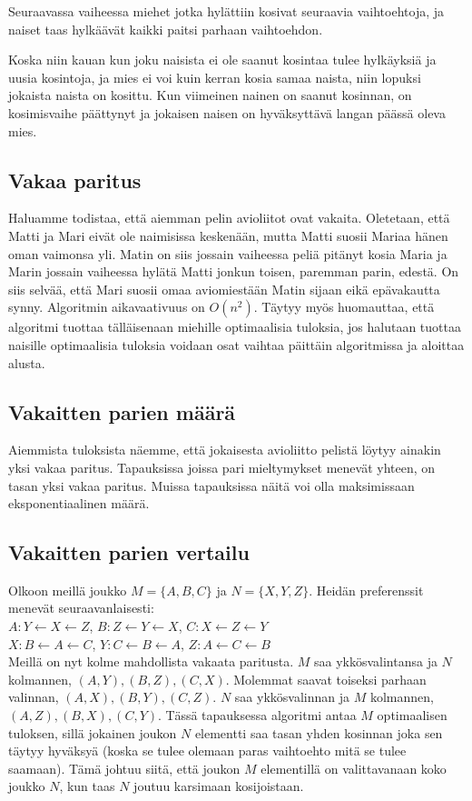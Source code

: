 \documentclass[finnish]{tktltiki2}
\theoremstyle{definition}
\theoremstyle{remark}
\begin{document}
Seuraavassa vaiheessa miehet jotka hylättiin kosivat seuraavia vaihtoehtoja, ja naiset taas hylkäävät kaikki paitsi parhaan vaihtoehdon.

Koska niin kauan kun joku naisista ei ole saanut kosintaa tulee hylkäyksiä ja uusia kosintoja, ja mies ei voi kuin kerran kosia samaa naista, niin lopuksi jokaista naista on kosittu. Kun viimeinen nainen on saanut kosinnan, on kosimisvaihe päättynyt ja jokaisen naisen on hyväksyttävä langan päässä oleva mies. \cite[p. 12-13]{gale62a}

\subsection{Vakaa paritus}
Haluamme todistaa, että aiemman pelin avioliitot ovat vakaita.
Oletetaan, että Matti ja Mari eivät ole naimisissa keskenään, mutta Matti suosii Mariaa hänen oman vaimonsa yli. Matin on siis jossain vaiheessa peliä pitänyt kosia Maria ja Marin jossain vaiheessa hylätä Matti jonkun toisen, paremman parin, edestä. On siis selvää, että Mari suosii omaa aviomiestään Matin sijaan eikä epävakautta synny. \cite[p. 13]{gale62a} Algoritmin aikavaativuus on $O(n^2)$. Täytyy myös huomauttaa, että algoritmi tuottaa tälläisenaan miehille optimaalisia tuloksia, jos halutaan tuottaa naisille optimaalisia tuloksia voidaan osat vaihtaa päittäin algoritmissa ja aloittaa alusta.

\subsection{Vakaitten parien määrä}
Aiemmista tuloksista näemme, että jokaisesta avioliitto pelistä löytyy ainakin yksi vakaa paritus. Tapauksissa joissa pari mieltymykset menevät yhteen, on tasan yksi vakaa paritus. Muissa tapauksissa näitä voi olla maksimissaan eksponentiaalinen määrä. \cite[p. 591]{Balinski}

\subsection{Vakaitten parien vertailu}
Olkoon meillä joukko $M = \{A, B, C\}$ ja $N = \{X, Y, Z\}$. Heidän preferenssit menevät seuraavanlaisesti:\\
$A: Y \leftarrow X \leftarrow Z$, $B: Z \leftarrow Y \leftarrow X$, $C: X \leftarrow Z \leftarrow Y$ \\
$X: B \leftarrow A \leftarrow C$, $Y: C \leftarrow B \leftarrow A$, $Z: A \leftarrow C \leftarrow B$ \\
Meillä on nyt kolme mahdollista vakaata paritusta. $M$ saa ykkösvalintansa ja $N$ kolmannen, $(A, Y), (B, Z), (C, X)$. Molemmat saavat toiseksi parhaan valinnan, $(A, X), (B, Y), (C, Z)$. $N$ saa ykkösvalinnan ja $M$ kolmannen, $(A, Z), (B, X), (C, Y)$. Tässä tapauksessa algoritmi antaa $M$ optimaalisen tuloksen, sillä jokainen joukon $N$ elementti saa tasan yhden kosinnan joka sen täytyy hyväksyä (koska se tulee olemaan paras vaihtoehto mitä se tulee saamaan). Tämä johtuu siitä, että joukon $M$ elementillä on valittavanaan koko joukko $N$, kun taas $N$ joutuu karsimaan kosijoistaan.
\end{document}
